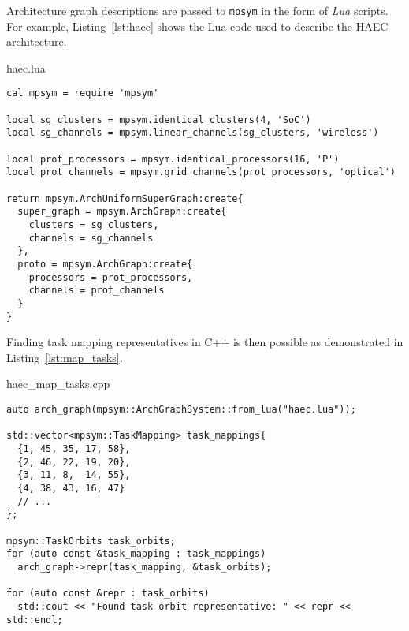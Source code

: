 Architecture graph descriptions are passed to \texttt{mpsym} in the form of
\textit{Lua} scripts. For example, Listing~\ref{lst:haec} shows the Lua code
used to describe the HAEC architecture.

\begin{listing}[H]
  \caption{haec.lua}
  \label{lst:haec}
  \begin{verbatim}
cal mpsym = require 'mpsym'

local sg_clusters = mpsym.identical_clusters(4, 'SoC')
local sg_channels = mpsym.linear_channels(sg_clusters, 'wireless')

local prot_processors = mpsym.identical_processors(16, 'P')
local prot_channels = mpsym.grid_channels(prot_processors, 'optical')

return mpsym.ArchUniformSuperGraph:create{
  super_graph = mpsym.ArchGraph:create{
    clusters = sg_clusters,
    channels = sg_channels
  },
  proto = mpsym.ArchGraph:create{
    processors = prot_processors,
    channels = prot_channels
  }
}
  \end{verbatim}
\end{listing}

\noindent
Finding task mapping representatives in C++ is then possible as demonstrated
in Listing~\ref{lst:map_tasks}.

\begin{listing}[H]
  \caption{haec\_map\_tasks.cpp}
  \label{lst:map_tasks}
  \begin{verbatim}
auto arch_graph(mpsym::ArchGraphSystem::from_lua("haec.lua"));

std::vector<mpsym::TaskMapping> task_mappings{
  {1, 45, 35, 17, 58},
  {2, 46, 22, 19, 20},
  {3, 11, 8,  14, 55},
  {4, 38, 43, 16, 47}
  // ...
};

mpsym::TaskOrbits task_orbits;
for (auto const &task_mapping : task_mappings)
  arch_graph->repr(task_mapping, &task_orbits);

for (auto const &repr : task_orbits)
  std::cout << "Found task orbit representative: " << repr << std::endl;
  \end{verbatim}
\end{listing}
